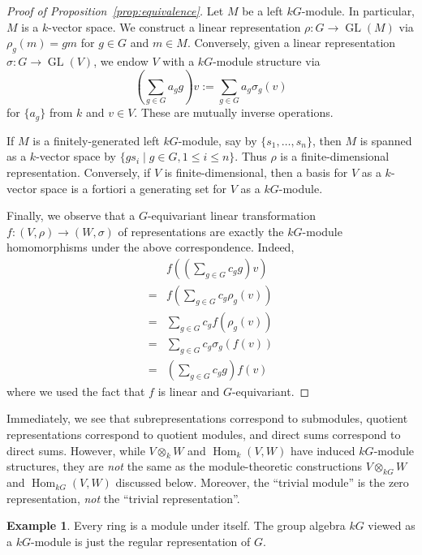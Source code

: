 \documentclass[12pt]{article}
\theoremstyle{plain}
\theoremstyle{definition}
\newtheorem{example}[theorem]{Example}
\theoremstyle{remark}
\numberwithin{equation}{section}
\begin{document}
\begin{proof}[Proof of Proposition~\ref{prop:equivalence}]
Let $M$ be a left $kG$-module.
In particular, $M$ is a $k$-vector space.
We construct a linear representation $\rho : G \to \operatorname{GL}(M)$
via $\rho_g(m)=gm$ for $g \in G$ and $m\in M$.
Conversely, given a linear representation $\sigma : G \to
\operatorname{GL}(V)$, we endow $V$ with a $kG$-module structure via
\[
\left( \sum_{g \in G} a_g g \right) v := \sum_{g \in G} a_g \sigma_g(v)
\]
for $\{a_g\}$ from $k$ and $v \in V$.
These are mutually inverse operations.

If $M$ is a finitely-generated left $kG$-module,
say by $\{s_1,\ldots,s_n\}$, then $M$ is spanned as a $k$-vector space
by $\{ gs_i \mid g \in G, 1 \le i \le n \}$.
Thus $\rho$ is a finite-dimensional representation.
Conversely, if $V$ is finite-dimensional, then a basis for $V$
as a $k$-vector space is a fortiori a generating set for $V$ as a
$kG$-module.

Finally, we observe that a $G$-equivariant linear transformation
$f : (V,\rho) \to (W,\sigma)$ of representations are exactly the $kG$-module
homomorphisms under the above correspondence.
Indeed,
\begin{align*}
&f\left( \left( \sum_{g\in G} c_g g \right) v \right)\\
=& f\left( \sum_{g\in G} c_g \rho_g(v) \right)\\
=& \sum_{g\in G} c_g f\left( \rho_g(v) \right)\\
=& \sum_{g\in G} c_g \sigma_g\left(f(v)\right)\\
=& \left(\sum_{g\in G} c_g g\right) f(v)
\end{align*}
where we used the fact that $f$ is linear and $G$-equivariant.
\end{proof}

Immediately, we see that subrepresentations correspond to submodules,
quotient representations correspond to quotient modules, and direct sums
correspond to direct sums.
However, while $V \otimes_k W$ and $\operatorname{Hom}_k(V,W)$ have
induced $kG$-module structures, they are \emph{not} the same as the
module-theoretic constructions $V \otimes_{kG} W$
and $\operatorname{Hom}_{kG}(V,W)$ discussed below.
Moreover, the ``trivial module'' is the zero representation,
\emph{not} the ``trivial representation''.

\begin{example}
Every ring is a module under itself.
The group algebra $kG$ viewed as a $kG$-module is just the regular
representation of $G$.
\end{example}
\end{document}
